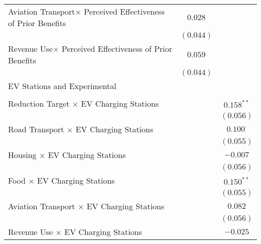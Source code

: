 \begin{center}
\begin{tiny}
\begin{longtable}{l@{} c@{} c@{}}
\quad Aviation Transport$\times$ Perceived Effectiveness of Prior Benefits & $0.028$          &                  \\
                                                                           & $(0.044)$        &                  \\
\quad Revenue Use$\times$ Perceived Effectiveness of Prior Benefits        & $0.059$          &                  \\
                                                                           & $(0.044)$        &                  \\
EV Stations and Experimental                                               &                  &                  \\
                                                                           &                  &                  \\
\quad Reduction Target $\times$ EV Charging Stations                       &                  & $0.158^{**}$     \\
                                                                           &                  & $(0.056)$        \\
\quad Road Transport $\times$ EV Charging Stations                         &                  & $0.100^{\cdot}$  \\
                                                                           &                  & $(0.055)$        \\
\quad Housing $\times$ EV Charging Stations                                &                  & $-0.007$         \\
                                                                           &                  & $(0.056)$        \\
\quad Food $\times$ EV Charging Stations                                   &                  & $0.150^{**}$     \\
                                                                           &                  & $(0.055)$        \\
\quad Aviation Transport $\times$ EV Charging Stations                     &                  & $0.082$          \\
                                                                           &                  & $(0.056)$        \\
\quad Revenue Use $\times$ EV Charging Stations                            &                  & $-0.025$         \\

\end{longtable}
\end{tiny}
\end{center}
